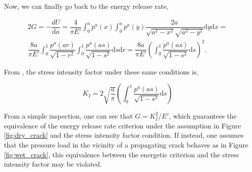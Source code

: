 \noindent Now, we can finally go back to the energy release rate,
    
\begin{multline}
    2G = -\dfrac{dU}{\text{d}a} = \dfrac{4}{\pi E'}\int_{0}^{a} p^{a}(x)\int_0^{a} p^{a}(y)\dfrac{2a}{\sqrt{a^2-x^2}\sqrt{a^2-y^2}} \text{d}y\text{d}x = \\
    \dfrac{8a}{\pi E'}\int_{0}^{1}\dfrac{p^{a}(ar)}{\sqrt{1-r^2}}\int_0^{1} \dfrac{p^{a}(as)}{\sqrt{1-s^2}} \text{d}s\text{d}r
    = \dfrac{8a}{\pi E'}\left( \int_{0}^{1}\dfrac{p^{a}(as)}{\sqrt{1-s^2}}\text{d}s\right)^2.
\end{multline}

\noindent From \cite{bazant2019fracture}, the stress intensity factor under these same conditions is,

\begin{equation}
    K_I = 2\sqrt{\dfrac{a}{\pi}}\left( \int_{0}^{1}\dfrac{p^{a}(as)}{\sqrt{1-s^2}}\text{d}s\right)
\end{equation}

\noindent From a simple inspection, one can see that $G = K_I^2/E'$, which guarantees the equivalence of the energy release rate criterion under the assumption in Figure \ref{fig:dry_crack} and the stress intensity factor condition. If instead, one assumes that the pressure load in the vicinity of a propagating crack behaves as in Figure \ref{fig:wet_crack}, this equivalence between the energetic criterion and the stress intensity factor may be violated.


